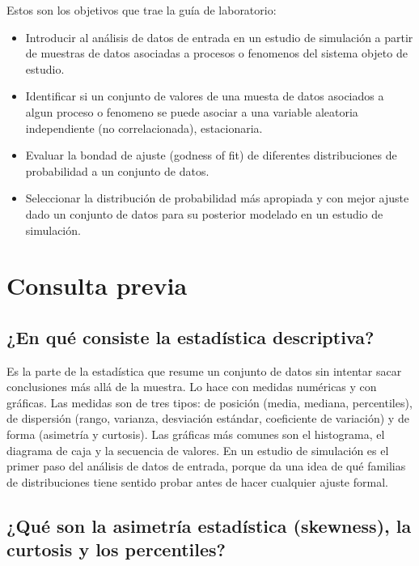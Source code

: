 \documentclass[11pt,letterpaper]{article}
\begin{document}
Estos son los objetivos que trae la guía de laboratorio:

\begin{itemize}[itemsep=2pt]
    \item Introducir al análisis de datos de entrada en un estudio de simulación a partir de muestras de datos asociadas a procesos o fenomenos del sistema objeto de estudio.
    \item Identificar si un conjunto de valores de una muesta de datos asociados a algun proceso o fenomeno se puede asociar a una variable aleatoria independiente (no correlacionada), estacionaria.
    \item Evaluar la bondad de ajuste (godness of fit) de diferentes distribuciones de probabilidad a un conjunto de datos.
    \item Seleccionar la distribución de probabilidad más apropiada y con mejor ajuste dado un conjunto de datos para su posterior modelado en un estudio de simulación.
\end{itemize}

\section{Consulta previa}

\subsection{¿En qué consiste la estadística descriptiva?}

Es la parte de la estadística que resume un conjunto de datos sin intentar sacar conclusiones más allá de la
muestra. Lo hace con medidas numéricas y con gráficas. Las medidas son de tres tipos: de posición (media, mediana,
percentiles), de dispersión (rango, varianza, desviación estándar, coeficiente de variación) y de forma
(asimetría y curtosis). Las gráficas más comunes son el histograma, el diagrama de caja y la secuencia de valores.
En un estudio de simulación es el primer paso del análisis de datos de entrada, porque da una idea de qué familias
de distribuciones tiene sentido probar antes de hacer cualquier ajuste formal.

\subsection{¿Qué son la asimetría estadística (skewness), la curtosis y los percentiles?}
\end{document}
